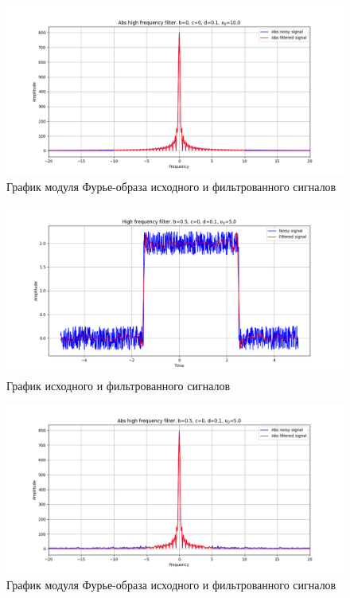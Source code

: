\documentclass[a4paper, 16pt]{article}
\begin{document}
    \begin{figure}[!htb]
        \centering
        \includegraphics[scale=0.485]{4_abs_u_U_nohigh.png}
        \captionsetup{skip=0pt}
        \caption{График модуля Фурье-образа исходного и фильтрованного сигналов}
        \label{fig:fig10}
    \end{figure}
    \newpage
    \begin{figure}[!htb]
        \centering
        \includegraphics[scale=0.485]{8_u_flt_u_nohigh.png}
        \captionsetup{skip=0pt}
        \caption{График исходного и фильтрованного сигналов}
        \label{fig:fig11}
    \end{figure}
    \begin{figure}[!htb]
        \centering
        \includegraphics[scale=0.485]{8_abs_u_U_nohigh.png}
        \captionsetup{skip=0pt}
        \caption{График модуля Фурье-образа исходного и фильтрованного сигналов}
        \label{fig:fig12}
    \end{figure}
\end{document}
